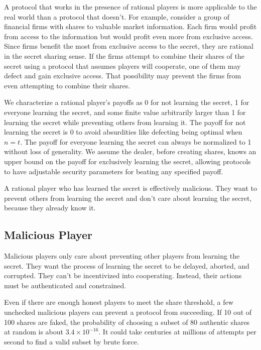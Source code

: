 \documentclass{dalcsthesis}
\begin{document}
A protocol that works in the presence of rational players is more applicable to the real world than a protocol that doesn't. For example, consider a group of financial firms with shares to valuable market information. Each firm would profit from access to the information but would profit even more from exclusive access. Since firms benefit the most from exclusive access to the secret, they are rational in the secret sharing sense. If the firms attempt to combine their shares of the secret using a protocol that assumes players will cooperate, one of them may defect and gain exclusive access. That possibility may prevent the firms from even attempting to combine their shares.

We characterize a rational player's payoffs as 0 for not learning the secret, 1 for everyone learning the secret, and some finite value arbitrarily larger than 1 for learning the secret while preventing others from learning it. The payoff for not learning the secret is 0 to avoid absurdities like defecting being optimal when $n=t$. The payoff for everyone learning the secret can always be normalized to 1 without loss of generality. We assume the dealer, before creating shares, knows an upper bound on the payoff for exclusively learning the secret, allowing protocols to have adjustable security parameters for beating any specified payoff.

A rational player who has learned the secret is effectively malicious. They want to prevent others from learning the secret and don't care about learning the secret, because they already know it.

\subsection{Malicious Player}

Malicious players only care about preventing other players from learning the secret. They want the process of learning the secret to be delayed, aborted, and corrupted. They can't be incentivized into cooperating. Instead, their actions must be authenticated and constrained.

Even if there are enough honest players to meet the share threshold, a few unchecked malicious players can prevent a protocol from succeeding. If 10 out of 100 shares are faked, the probability of choosing a subset of 80 authentic shares at random is about $3.4 \times 10^{-16}$. It could take centuries at millions of attempts per second to find a valid subset by brute force.
\end{document}
